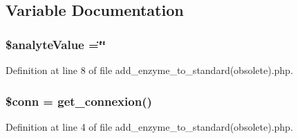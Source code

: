 \subsection{Variable Documentation}
\hypertarget{add__enzyme__to__standard_07obsolete_08_8php_aa0668b8f5734a61bcc5107303a90615a}{
\subsubsection[{\$analyte\-Value}]{\setlength{\rightskip}{0pt plus 5cm}\$analyte\-Value =\char`\"{}\char`\"{}}}\label{add__enzyme__to__standard_07obsolete_08_8php_aa0668b8f5734a61bcc5107303a90615a}


Definition at line 8 of file add\-\_\-enzyme\-\_\-to\-\_\-standard(obsolete).\-php.

\hypertarget{add__enzyme__to__standard_07obsolete_08_8php_aa8a5a87b9c1a6a0819b88447cbe41877}{
\subsubsection[{\$conn}]{\setlength{\rightskip}{0pt plus 5cm}\$conn = {\bf get\-\_\-connexion}()}}\label{add__enzyme__to__standard_07obsolete_08_8php_aa8a5a87b9c1a6a0819b88447cbe41877}


Definition at line 4 of file add\-\_\-enzyme\-\_\-to\-\_\-standard(obsolete).\-php.

